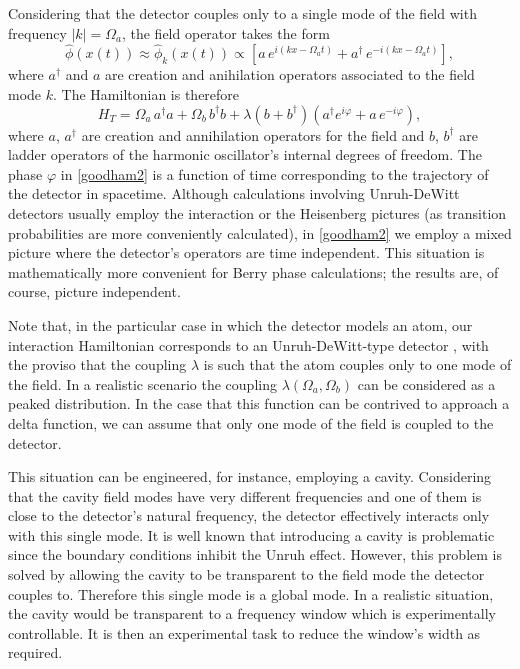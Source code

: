  Considering that the detector couples only to a single mode of the field with frequency  $|k|=\Omega_a$, the field operator takes the form
 \begin{equation}
 \hat\phi(x(t))\approx\hat\phi_k(x(t))\propto \left[a\, e^{i(kx-\Omega_a t)}+a^\dagger\, e^{-i(kx-\Omega_a t)}\right],
 \end{equation}
  where $a^{\dagger}$ and $a$ are creation and anihilation operators associated to the field mode $k$.  The Hamiltonian is therefore
\begin{equation}\label{goodham2}
H_{T}=\Omega_a\, a^\dagger a +\Omega_b\, b^\dagger b+ \lambda (b+b^\dagger)(a^\dagger e^{i\varphi}\!+ a\, e^{-i\varphi}),
\end{equation}
where $a$, $a^{\dagger}$ are creation and annihilation operators for the field and $b$, $b^{\dagger}$ are ladder operators of the harmonic oscillator's internal degrees of freedom. The phase $\varphi$  in \eqref{goodham2} is a function of time corresponding to the trajectory of the detector in spacetime.  Although calculations involving  Unruh-DeWitt detectors usually employ the interaction or the Heisenberg pictures (as transition probabilities are more conveniently calculated), in \eqref{goodham2} we employ a mixed picture where the detector's operators are time independent. This situation is mathematically more convenient for Berry phase calculations; the results are, of course, picture independent. 

  Note that,  in the particular case in which the detector models an atom, our interaction Hamiltonian corresponds to an Unruh-DeWitt-type detector \cite{Crispino},  with the proviso  that  the coupling $\lambda$ is such that the atom couples only to one mode of the field. In a realistic scenario the coupling $\lambda (\Omega_a,\Omega_b)$ can be considered as a peaked distribution. In the case that this function can be contrived to approach a delta function, we can assume  that only one mode of the field is coupled to the detector.  

This situation can be engineered, for instance, employing a cavity. Considering that the cavity field modes have very different frequencies and one of them is close to the detector's natural frequency,   the  detector effectively interacts only with this single mode. It is well known that introducing a cavity is problematic since the boundary conditions inhibit the Unruh effect. However, this problem is solved by allowing the cavity to be transparent to the field mode the detector couples to.  Therefore this single mode is a global mode.  In a realistic situation, the cavity would be transparent to a frequency window which is experimentally controllable. It is then an experimental task to reduce the window's width as required. 

